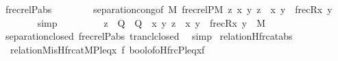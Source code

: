 \begin{isabellebody}
\ frecrelP{\isacharunderscore}{\kern0pt}abs\isanewline
\ \ \ \ \ \ \ \ separation{\isacharunderscore}{\kern0pt}cong{\isacharbrackleft}{\kern0pt}of\ {\isachardoublequoteopen}{\isacharhash}{\kern0pt}{\isacharhash}{\kern0pt}M{\isachardoublequoteclose}\ {\isachardoublequoteopen}frecrelP{\isacharparenleft}{\kern0pt}{\isacharhash}{\kern0pt}{\isacharhash}{\kern0pt}M{\isacharparenright}{\kern0pt}{\isachardoublequoteclose}\ {\isachardoublequoteopen}{\isasymlambda}z{\isachardot}{\kern0pt}\ {\isasymexists}x\ y{\isachardot}{\kern0pt}\ z\ {\isacharequal}{\kern0pt}\ {\isasymlangle}x{\isacharcomma}{\kern0pt}\ y{\isasymrangle}\ {\isasymand}\ frecR{\isacharparenleft}{\kern0pt}x{\isacharcomma}{\kern0pt}\ y{\isacharparenright}{\kern0pt}{\isachardoublequoteclose}{\isacharbrackright}{\kern0pt}\isanewline
\ \ \ \ \ \ \isamarkupfalse%
\ simp\isanewline
\ \ \isamarkupfalse%
\isanewline
\ \ \isamarkupfalse%
\isanewline
\ \ \isamarkupfalse%
\ {\isachardoublequoteopen}{\isacharbraceleft}{\kern0pt}z\ {\isasymin}\ {\isacharquery}{\kern0pt}Q\ {\isasymtimes}\ {\isacharquery}{\kern0pt}Q\ {\isachardot}{\kern0pt}\ {\isasymexists}x\ y{\isachardot}{\kern0pt}\ z\ {\isacharequal}{\kern0pt}\ {\isasymlangle}x{\isacharcomma}{\kern0pt}\ y{\isasymrangle}\ {\isasymand}\ frecR{\isacharparenleft}{\kern0pt}x{\isacharcomma}{\kern0pt}\ y{\isacharparenright}{\kern0pt}{\isacharbraceright}{\kern0pt}{\isacharcircum}{\kern0pt}{\isacharplus}{\kern0pt}\ {\isasymin}\ M{\isachardoublequoteclose}\isanewline
\ \ \ \ \isamarkupfalse%
\ separation{\isacharunderscore}{\kern0pt}closed\ frecrelP{\isacharunderscore}{\kern0pt}abs\ trancl{\isacharunderscore}{\kern0pt}closed\ \isamarkupfalse%
\ simp\isanewline
{}\isamarkupfalse%
%
\endisatagproof
{\isafoldproof}%
%
\isadelimproof
\isanewline
%
\endisadelimproof
\isanewline
{}\isamarkupfalse%
\ relation{}{\isacharunderscore}{\kern0pt}Hfrc{\isacharunderscore}{\kern0pt}at{\isacharunderscore}{\kern0pt}abs{\isacharcolon}{\kern0pt}\isanewline
\ \ {\isachardoublequoteopen}relation{}{\isacharparenleft}{\kern0pt}{\isacharhash}{\kern0pt}{\isacharhash}{\kern0pt}M{\isacharcomma}{\kern0pt}is{\isacharunderscore}{\kern0pt}Hfrc{\isacharunderscore}{\kern0pt}at{\isacharparenleft}{\kern0pt}{\isacharhash}{\kern0pt}{\isacharhash}{\kern0pt}M{\isacharcomma}{\kern0pt}P{\isacharcomma}{\kern0pt}leq{\isacharparenright}{\kern0pt}{\isacharcomma}{\kern0pt}{\isasymlambda}x\ f{\isachardot}{\kern0pt}\ bool{\isacharunderscore}{\kern0pt}of{\isacharunderscore}{\kern0pt}o{\isacharparenleft}{\kern0pt}Hfrc{\isacharparenleft}{\kern0pt}P{\isacharcomma}{\kern0pt}leq{\isacharcomma}{\kern0pt}x{\isacharcomma}{\kern0pt}f{\isacharparenright}{\kern0pt}{\isacharparenright}{\kern0pt}{\isacharparenright}{\kern0pt}{\isachardoublequoteclose}\isanewline

\end{isabellebody}
